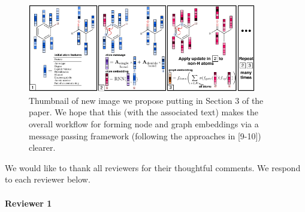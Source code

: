 \documentclass{article}
\begin{document}


\begin{figure}
\centering
  \includegraphics[width=10cm]{graph_nn.pdf}
 \caption{Thumbnail of new image we propose  putting in Section 3 of the paper. We hope that this (with the associated text) makes the overall workflow for forming node and graph embeddings via a message passing framework (following the approaches in [9-10]) clearer.}
 \label{fig:new-diagram}
 \vspace{-5ex}
\end{figure}

We would like to thank all reviewers for their thoughtful comments. 
We respond to each reviewer below.

\paragraph{Reviewer 1}
\end{document}
